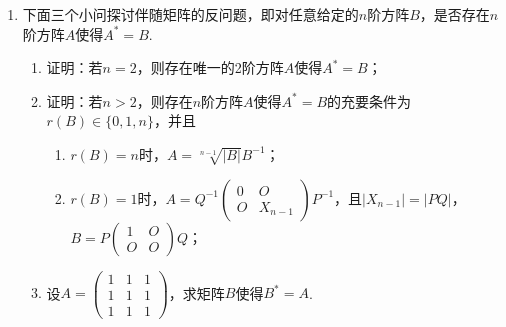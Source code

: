 \begin{enumerate}
    \item 下面三个小问探讨伴随矩阵的反问题，即对任意给定的$n$阶方阵$B$，是否存在$n$阶方阵$A$使得$A^*=B$.
          \begin{enumerate}
              \item 证明：若$n=2$，则存在唯一的2阶方阵$A$使得$A^*=B$；

              \item 证明：若$n > 2$，则存在$n$阶方阵$A$使得$A^*=B$的充要条件为$r(B) \in \{0,1,n\}$，并且
                    \begin{enumerate}
                        \item $r(B)=n$时，$A=\sqrt[n-1]{|B|}B^{-1}$；

                        \item $r(B)=1$时，$A=Q^{-1}\begin{pmatrix}
                                      0 & O \\ O & X_{n-1}
                                  \end{pmatrix}P^{-1}$，且$|X_{n-1}|=|PQ|$，$B=P\begin{pmatrix}
                                      1 & O \\ O & O
                                  \end{pmatrix}Q$；
                    \end{enumerate}

              \item 设$A=\begin{pmatrix}
                            1 & 1 & 1 \\ 1 & 1 & 1 \\ 1 & 1 & 1
                        \end{pmatrix}$，求矩阵$B$使得$B^*=A$.
          \end{enumerate}
\end{enumerate}
